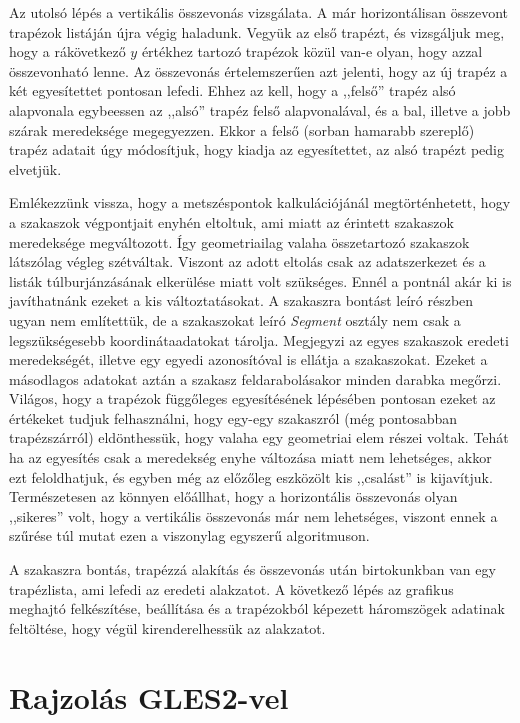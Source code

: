 \documentclass[12pt]{report}
\theoremstyle{definition}
\newcommand{\func}[1]{{\textsl{#1}}}
\begin{document}
Az utolsó lépés a vertikális összevonás vizsgálata. A már horizontálisan
összevont trapézok listáján újra végig haladunk. Vegyük az első trapézt, és
vizsgáljuk meg, hogy a rákövetkező $y$ értékhez tartozó trapézok közül van-e
olyan, hogy azzal összevonható lenne. Az összevonás értelemszerűen azt jelenti,
hogy az új trapéz a két egyesítettet pontosan lefedi. Ehhez az kell, hogy a
,,felső'' trapéz alsó alapvonala egybeessen az ,,alsó'' trapéz felső
alapvonalával, és a bal, illetve a jobb szárak meredeksége megegyezzen. Ekkor a
felső (sorban hamarabb szereplő) trapéz adatait úgy módosítjuk, hogy kiadja az
egyesítettet, az alsó trapézt pedig elvetjük.

Emlékezzünk vissza, hogy a metszéspontok kalkulációjánál megtörténhetett, hogy
a szakaszok végpontjait enyhén eltoltuk, ami miatt az érintett szakaszok
meredeksége megváltozott. Így geometriailag valaha összetartozó szakaszok
látszólag végleg szétváltak. Viszont az adott eltolás csak az adatszerkezet és
a listák túlburjánzásának elkerülése miatt volt szükséges. Ennél a pontnál akár
ki is javíthatnánk ezeket a kis változtatásokat. A szakaszra bontást leíró
részben ugyan nem említettük, de a szakaszokat leíró \func{Segment} osztály nem
csak a legszükségesebb koordinátaadatokat tárolja. Megjegyzi az egyes szakaszok
eredeti meredekségét, illetve egy egyedi azonosítóval is ellátja a szakaszokat.
Ezeket a másodlagos adatokat aztán a szakasz feldarabolásakor minden darabka
megőrzi. Világos, hogy a trapézok függőleges egyesítésének lépésében pontosan
ezeket az értékeket tudjuk felhasználni, hogy egy-egy szakaszról (még
pontosabban trapézszárról) eldönthessük, hogy valaha egy geometriai elem részei
voltak. Tehát ha az egyesítés csak a meredekség enyhe változása miatt nem
lehetséges, akkor ezt feloldhatjuk, és egyben még az előzőleg eszközölt kis
,,csalást'' is kijavítjuk. Természetesen az könnyen előállhat, hogy a
horizontális összevonás olyan ,,sikeres'' volt, hogy a vertikális összevonás
már nem lehetséges, viszont ennek a szűrése túl mutat ezen a viszonylag egyszerű
algoritmuson.

A szakaszra bontás, trapézzá alakítás és összevonás után birtokunkban
van egy trapézlista, ami lefedi az eredeti alakzatot. A következő lépés az
grafikus meghajtó felkészítése, beállítása és a trapézokból képezett
háromszögek adatinak feltöltése, hogy végül kirenderelhessük az alakzatot.

  \section{Rajzolás GLES2-vel}
\end{document}
